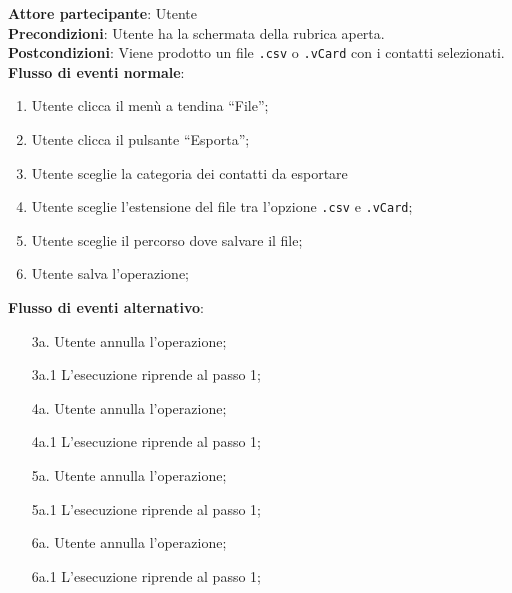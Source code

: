\begin{tcolorbox}[colback=white,colframe=black!80!white,title=\textbf{C6 - Esportare rubrica}]
	\textbf{Attore partecipante}: Utente
	\\\textbf{Precondizioni}: Utente ha la schermata della rubrica aperta.
	\\\textbf{Postcondizioni}: Viene prodotto un file \texttt{.csv} o \texttt{.vCard} con i contatti selezionati.
	\\\textbf{Flusso di eventi normale}:
	\begin{enumerate}[noitemsep, topsep=0pt]
		\item Utente clicca il menù a tendina “File”;
		\item Utente clicca il pulsante “Esporta”;
		\item Utente sceglie la categoria dei contatti da esportare
		\item Utente sceglie l’estensione del file tra l’opzione \texttt{.csv} e \texttt{.vCard};
		\item Utente sceglie il percorso dove salvare il file;
		\item Utente salva l’operazione;	
	\end{enumerate}
	\textbf{Flusso di eventi alternativo}:
	\begin{itemize}[noitemsep, topsep=0pt]
		\item[3a. ] Utente annulla l’operazione;
		\item[3a.1] L’esecuzione riprende al passo 1;
		\item[4a. ] Utente annulla l’operazione;
		\item[4a.1] L’esecuzione riprende al passo 1;
		\item[5a. ] Utente annulla l’operazione;
		\item[5a.1] L’esecuzione riprende al passo 1;
		\item[6a. ] Utente annulla l’operazione;
		\item[6a.1] L’esecuzione riprende al passo 1;	
	\end{itemize}
\end{tcolorbox}

